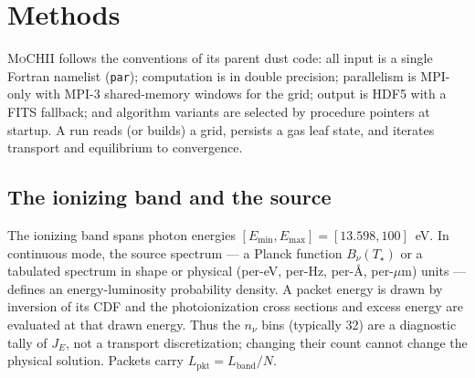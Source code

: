 \documentclass[twocolumn,linenumbers]{aastex702}
\newcommand{\code}[1]{\texttt{#1}}
\newcommand{\MoCHII}{\textsc{MoCHII}}
\begin{document}
\section{Methods}
\label{sec:methods}

\MoCHII{} follows the conventions of its parent dust code: all input is a
single Fortran namelist (\code{par}); computation is in double precision;
parallelism is MPI-only with MPI-3 shared-memory windows for the grid;
output is HDF5 with a FITS fallback; and algorithm variants are selected
by procedure pointers at startup.  A run reads (or builds) a grid, persists
a gas leaf state, and iterates transport and equilibrium to convergence.

\subsection{The ionizing band and the source}
\label{sec:band}

The ionizing band spans photon energies $[E_{\min}, E_{\max}] =
[13.598, 100]$~eV.  In continuous mode, the source spectrum --- a Planck
function $B_\nu(T_\star)$ or a tabulated spectrum in shape or physical
(per-eV, per-Hz, per-\AA, per-$\mu$m) units --- defines an energy-luminosity
probability density.  A packet energy is drawn by inversion of its CDF and
the photoionization cross sections and excess energy are evaluated at that
drawn energy.  Thus the $n_\nu$ bins (typically 32) are a diagnostic tally
of $J_E$, not a transport discretization; changing their count cannot change
the physical solution.  Packets carry $L_{\mathrm{pkt}} =
L_{\mathrm{band}}/N$.
\end{document}
